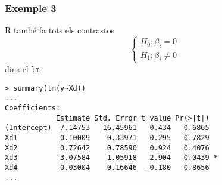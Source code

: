 \documentclass[12pt,t]{beamer}
\theoremstyle{plain}
\theoremstyle{definition}
\begin{document}
\begin{frame}[fragile]
\frametitle{Exemple 3}
R també fa tots els contrastos
$$
\left\{\begin{array}{l} H_0: \beta_i=0 \\
H_1: \beta_i\neq 0 \end{array}
\right.
$$
dins el  \texttt{lm}
\medskip

{\footnotesize
\begin{verbatim}
> summary(lm(y~Xd))
...
Coefficients:
            Estimate Std. Error t value Pr(>|t|)  
(Intercept)  7.14753   16.45961   0.434   0.6865  
Xd1          0.10009    0.33971   0.295   0.7829  
Xd2          0.72642    0.78590   0.924   0.4076  
Xd3          3.07584    1.05918   2.904   0.0439 *
Xd4         -0.03004    0.16646  -0.180   0.8656  
...
\end{verbatim}
}

\end{frame}
\end{document}
